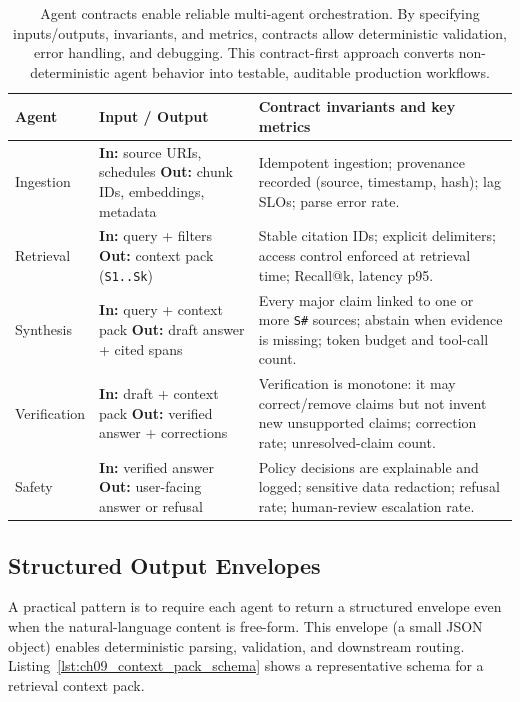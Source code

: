\begin{table}[t]
\centering
\small
\caption{Agent contracts enable reliable multi-agent orchestration. By specifying inputs/outputs, invariants, and metrics, contracts allow deterministic validation, error handling, and debugging. This contract-first approach converts non-deterministic agent behavior into testable, auditable production workflows.}
\label{tab:ch09_ishtar_agent_contracts}
\setlength{\tabcolsep}{6pt}
\renewcommand{\arraystretch}{1.3}
\begin{tabularx}{\linewidth}{@{}p{2.6cm}p{3.1cm}X@{}}
\toprule
\rowcolor{gray!15}
\textbf{Agent} & \textbf{Input / Output} & \textbf{Contract invariants and key metrics} \\
\midrule
Ingestion &
\textbf{In:} source URIs, schedules \newline
\textbf{Out:} chunk IDs, embeddings, metadata &
Idempotent ingestion; provenance recorded (source, timestamp, hash); lag SLOs; parse error rate. \\
Retrieval &
\textbf{In:} query + filters \newline
\textbf{Out:} context pack (\texttt{S1..Sk}) &
Stable citation IDs; explicit delimiters; access control enforced at retrieval time; Recall@k, latency p95. \\
Synthesis &
\textbf{In:} query + context pack \newline
\textbf{Out:} draft answer + cited spans &
Every major claim linked to one or more \texttt{S\#} sources; abstain when evidence is missing; token budget and tool-call count. \\
Verification &
\textbf{In:} draft + context pack \newline
\textbf{Out:} verified answer + corrections &
Verification is monotone: it may correct/remove claims but not invent new unsupported claims; correction rate; unresolved-claim count. \\
Safety &
\textbf{In:} verified answer \newline
\textbf{Out:} user-facing answer or refusal &
Policy decisions are explainable and logged; sensitive data redaction; refusal rate; human-review escalation rate. \\
\bottomrule
\end{tabularx}
\end{table}

\subsection{Structured Output Envelopes}
A practical pattern is to require each agent to return a structured envelope even when the natural-language content is free-form.
This envelope (a small JSON object) enables deterministic parsing, validation, and downstream routing.
Listing~\ref{lst:ch09_context_pack_schema} shows a representative schema for a retrieval context pack.

